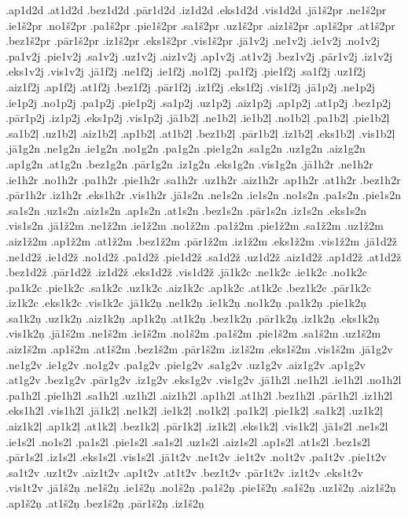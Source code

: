 {.ap1d2d
.at1d2d
.bez1d2d
.pār1d2d
.iz1d2d
.eks1d2d
.vis1d2d
.jā1š2pr
.ne1š2pr
.ie1š2pr
.no1š2pr
.pa1š2pr
.pie1š2pr
.sa1š2pr
.uz1š2pr
.aiz1š2pr
.ap1š2pr
.at1š2pr
.bez1š2pr
.pār1š2pr
.iz1š2pr
.eks1š2pr
.vis1š2pr
.jā1v2j
.ne1v2j
.ie1v2j
.no1v2j
.pa1v2j
.pie1v2j
.sa1v2j
.uz1v2j
.aiz1v2j
.ap1v2j
.at1v2j
.bez1v2j
.pār1v2j
.iz1v2j
.eks1v2j
.vis1v2j
.jā1f2j
.ne1f2j
.ie1f2j
.no1f2j
.pa1f2j
.pie1f2j
.sa1f2j
.uz1f2j
.aiz1f2j
.ap1f2j
.at1f2j
.bez1f2j
.pār1f2j
.iz1f2j
.eks1f2j
.vis1f2j
.jā1p2j
.ne1p2j
.ie1p2j
.no1p2j
.pa1p2j
.pie1p2j
.sa1p2j
.uz1p2j
.aiz1p2j
.ap1p2j
.at1p2j
.bez1p2j
.pār1p2j
.iz1p2j
.eks1p2j
.vis1p2j
.jā1b2ļ
.ne1b2ļ
.ie1b2ļ
.no1b2ļ
.pa1b2ļ
.pie1b2ļ
.sa1b2ļ
.uz1b2ļ
.aiz1b2ļ
.ap1b2ļ
.at1b2ļ
.bez1b2ļ
.pār1b2ļ
.iz1b2ļ
.eks1b2ļ
.vis1b2ļ
.jā1g2n
.ne1g2n
.ie1g2n
.no1g2n
.pa1g2n
.pie1g2n
.sa1g2n
.uz1g2n
.aiz1g2n
.ap1g2n
.at1g2n
.bez1g2n
.pār1g2n
.iz1g2n
.eks1g2n
.vis1g2n
.jā1h2r
.ne1h2r
.ie1h2r
.no1h2r
.pa1h2r
.pie1h2r
.sa1h2r
.uz1h2r
.aiz1h2r
.ap1h2r
.at1h2r
.bez1h2r
.pār1h2r
.iz1h2r
.eks1h2r
.vis1h2r
.jā1s2n
.ne1s2n
.ie1s2n
.no1s2n
.pa1s2n
.pie1s2n
.sa1s2n
.uz1s2n
.aiz1s2n
.ap1s2n
.at1s2n
.bez1s2n
.pār1s2n
.iz1s2n
.eks1s2n
.vis1s2n
.jā1ž2m
.ne1ž2m
.ie1ž2m
.no1ž2m
.pa1ž2m
.pie1ž2m
.sa1ž2m
.uz1ž2m
.aiz1ž2m
.ap1ž2m
.at1ž2m
.bez1ž2m
.pār1ž2m
.iz1ž2m
.eks1ž2m
.vis1ž2m
.jā1d2ž
.ne1d2ž
.ie1d2ž
.no1d2ž
.pa1d2ž
.pie1d2ž
.sa1d2ž
.uz1d2ž
.aiz1d2ž
.ap1d2ž
.at1d2ž
.bez1d2ž
.pār1d2ž
.iz1d2ž
.eks1d2ž
.vis1d2ž
.jā1k2c
.ne1k2c
.ie1k2c
.no1k2c
.pa1k2c
.pie1k2c
.sa1k2c
.uz1k2c
.aiz1k2c
.ap1k2c
.at1k2c
.bez1k2c
.pār1k2c
.iz1k2c
.eks1k2c
.vis1k2c
.jā1k2ņ
.ne1k2ņ
.ie1k2ņ
.no1k2ņ
.pa1k2ņ
.pie1k2ņ
.sa1k2ņ
.uz1k2ņ
.aiz1k2ņ
.ap1k2ņ
.at1k2ņ
.bez1k2ņ
.pār1k2ņ
.iz1k2ņ
.eks1k2ņ
.vis1k2ņ
.jā1š2m
.ne1š2m
.ie1š2m
.no1š2m
.pa1š2m
.pie1š2m
.sa1š2m
.uz1š2m
.aiz1š2m
.ap1š2m
.at1š2m
.bez1š2m
.pār1š2m
.iz1š2m
.eks1š2m
.vis1š2m
.jā1g2v
.ne1g2v
.ie1g2v
.no1g2v
.pa1g2v
.pie1g2v
.sa1g2v
.uz1g2v
.aiz1g2v
.ap1g2v
.at1g2v
.bez1g2v
.pār1g2v
.iz1g2v
.eks1g2v
.vis1g2v
.jā1h2l
.ne1h2l
.ie1h2l
.no1h2l
.pa1h2l
.pie1h2l
.sa1h2l
.uz1h2l
.aiz1h2l
.ap1h2l
.at1h2l
.bez1h2l
.pār1h2l
.iz1h2l
.eks1h2l
.vis1h2l
.jā1k2ļ
.ne1k2ļ
.ie1k2ļ
.no1k2ļ
.pa1k2ļ
.pie1k2ļ
.sa1k2ļ
.uz1k2ļ
.aiz1k2ļ
.ap1k2ļ
.at1k2ļ
.bez1k2ļ
.pār1k2ļ
.iz1k2ļ
.eks1k2ļ
.vis1k2ļ
.jā1s2l
.ne1s2l
.ie1s2l
.no1s2l
.pa1s2l
.pie1s2l
.sa1s2l
.uz1s2l
.aiz1s2l
.ap1s2l
.at1s2l
.bez1s2l
.pār1s2l
.iz1s2l
.eks1s2l
.vis1s2l
.jā1t2v
.ne1t2v
.ie1t2v
.no1t2v
.pa1t2v
.pie1t2v
.sa1t2v
.uz1t2v
.aiz1t2v
.ap1t2v
.at1t2v
.bez1t2v
.pār1t2v
.iz1t2v
.eks1t2v
.vis1t2v
.jā1š2ņ
.ne1š2ņ
.ie1š2ņ
.no1š2ņ
.pa1š2ņ
.pie1š2ņ
.sa1š2ņ
.uz1š2ņ
.aiz1š2ņ
.ap1š2ņ
.at1š2ņ
.bez1š2ņ
.pār1š2ņ
.iz1š2ņ
}
